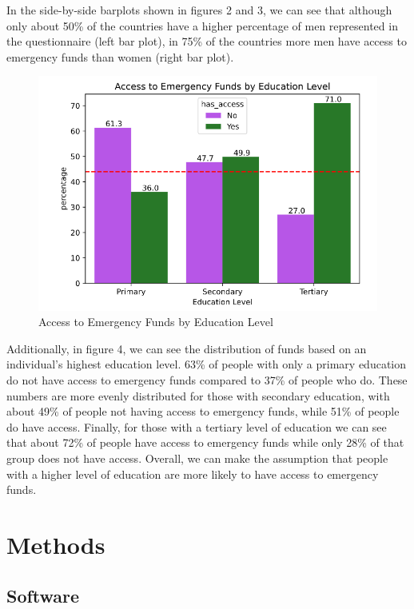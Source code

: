 \documentclass[water,article,submit,moreauthors,pdftex]{mdpi}
\begin{document}
In the side-by-side barplots shown in figures 2 and 3, we can see that
although only about 50\% of the countries have a higher percentage of
men represented in the questionnaire (left bar plot), in 75\% of the
countries more men have access to emergency funds than women (right bar
plot).

\begin{figure}
\centering
\includegraphics[width=\textwidth,height=0.5\textheight]{images/access_by_educ_level.png}
\caption{Access to Emergency Funds by Education Level}
\end{figure}

Additionally, in figure 4, we can see the distribution of funds based on
an individual's highest education level. 63\% of people with only a
primary education do not have access to emergency funds compared to 37\%
of people who do. These numbers are more evenly distributed for those
with secondary education, with about 49\% of people not having access to
emergency funds, while 51\% of people do have access. Finally, for those
with a tertiary level of education we can see that about 72\% of people
have access to emergency funds while only 28\% of that group does not
have access. Overall, we can make the assumption that people with a
higher level of education are more likely to have access to emergency
funds.

\hypertarget{methods}{%
\section{Methods}\label{methods}}

\hypertarget{software}{%
\subsection{Software}\label{software}}
\end{document}

